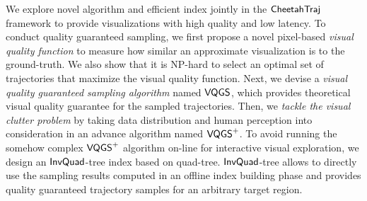 

 We explore novel algorithm and efficient index jointly in the $\mathsf{CheetahTraj}$ framework to provide visualizations with high quality and low latency. To conduct quality guaranteed sampling, we first propose a novel pixel-based \textit{visual quality function} to measure how similar an approximate visualization is to the ground-truth. We also show that it is NP-hard to select an optimal set of trajectories that maximize the visual quality function. Next, we devise a \textit{visual quality guaranteed sampling algorithm} named $\mathsf{VQGS}$, which provides theoretical visual quality guarantee for the sampled trajectories. Then, we \textit{tackle the visual clutter problem} by taking data distribution and human perception into consideration in an advance algorithm named $\mathsf{VQGS}^+$. To avoid running the somehow complex $\mathsf{VQGS}^+$ algorithm on-line for interactive visual exploration, we design an $\mathsf{InvQuad}$-tree index based on quad-tree. $\mathsf{InvQuad}$-tree allows to directly use the sampling results computed in an offline index building phase and provides quality guaranteed trajectory samples for an arbitrary target region.




